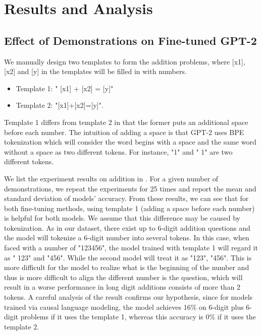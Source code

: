 \section{Results and Analysis}
\label{sec:experiment}
\subsection{Effect of Demonstrations on Fine-tuned GPT-2}

We manually design two templates to form the addition problems, where [x1], [x2] and [y] in the templates will be filled in with numbers.

\begin{itemize}
\item Template 1: " [x1] + [x2] = [y]"
\item Template 2: "[x1]+[x2]=[y]".
\end{itemize}

Template 1 differs from template 2 in that the former puts an additional space before each number. The intuition of adding a space is that GPT-2 uses BPE tokenization which will consider the word begins with a space and the same word without a space as two different tokens. For instance, "1" and " 1" are two different tokens.

We list the experiment results on addition in . For a given number of demonstrations, we repeat the experiments for 25 times and report the mean and standard deviation of models' accuracy. From these results, we can see that for both fine-tuning methods, using template 1 (adding a space before each number) is helpful for both models. We assume that this difference may be caused by tokenization. As in our dataset, there exist up to 6-digit addition questions and the model will tokenize a 6-digit number into several tokens. In this case, when faced with a number of "123456",  the model trained with template 1 will regard it as " 123" and "456". While the second model will treat it as "123", "456". This is more difficult for the model to realize what is the beginning of the number and thus is more difficult to align the different number is the question, which will result in a worse performance in long digit additions consists of more than 2 tokens. A careful analysis of the result confirms our hypothesis, since for models trained via causal language modeling, the model achieves 16\% on 6-digit plus 6-digit problems if it uses the template 1, whereas this accuracy is 0\% if it uses the template 2.

